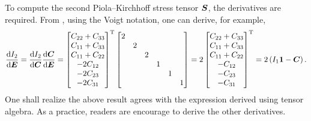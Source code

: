To compute the second Piola--Kirchhoff stress tensor $\bm{S}$, the derivatives are required.
From , using the Voigt notation, one can derive, for example,
\begin{gather}
    \dfrac{\mathrm{d}I_2}{\mathrm{d}\bm{E}}=\dfrac{\mathrm{d}I_2}{\mathrm{d}\bm{C}}\dfrac{\mathrm{d}\bm{C}}{\mathrm{d}\bm{E}}=\begin{bmatrix}
        C_{22}+C_{33} \\
        C_{11}+C_{33} \\
        C_{11}+C_{22} \\
        -2C_{12}      \\
        -2C_{23}      \\
        -2C_{31}
    \end{bmatrix}^{\mathrm{T}}\begin{bmatrix}
        2 &   &   &   &   &   \\
          & 2 &   &   &   &   \\
          &   & 2 &   &   &   \\
          &   &   & 1 &   &   \\
          &   &   &   & 1 &   \\
          &   &   &   &   & 1 \\
    \end{bmatrix}=2\begin{bmatrix}
        C_{22}+C_{33} \\
        C_{11}+C_{33} \\
        C_{11}+C_{22} \\
        -C_{12}       \\
        -C_{23}       \\
        -C_{31}
    \end{bmatrix}^{\mathrm{T}}=2\left(I_1\bm{1}-\bm{C}\right).
\end{gather}
One shall realize the above result agrees with the expression derived using tensor algebra.
As a practice, readers are encourage to derive the other derivatives.
